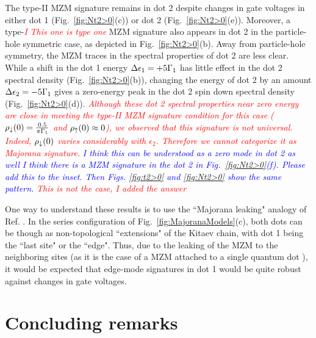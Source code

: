 \documentclass[showpacs,aps,prb,reprint,superscriptaddress]{revtex4-2}
\newcommand{\LUIS}[1]{\textcolor{blue}{\fbox{Luis} {\sl#1}}}
\newcommand{\Jesus}[1]{\textcolor{red}{\fbox{Jesus} {\sl#1}}}
\newcommand{\change}[1]{\textcolor{red}{\sl#1}}
\begin{document}
The type-II MZM signature remains in dot 2 despite changes in gate voltages in either dot 1  (Fig.\ \ref{fig:Nt2>0}(c)) or dot 2 (Fig.\ \ref{fig:Nt2>0}(e)). Moreover,  a type-\change{I} \Jesus{This one is type one} MZM signature also appears in dot 2  in the particle-hole symmetric case, as depicted in Fig.\ \ref{fig:Nt2>0}(b). Away from particle-hole symmetry, the MZM traces in the spectral properties of dot 2 are less clear. While a shift in the dot 1 energy $\Delta \epsilon_1=+5 \Gamma_1$ has little effect in the dot 2 spectral density (Fig.\ \ref{fig:Nt2>0}(b)), changing the energy of dot 2 by an amount  $\Delta \epsilon_2=-5 \Gamma_1$ gives a zero-energy peak in the dot 2 spin down spectral density (Fig.\ \ref{fig:Nt2>0}(d)). \change{Although these dot 2 spectral properties near zero energy are close in meeting the type-II MZM signature condition for this case ($\rho_\downarrow(0)=\frac{0.5}{\pi \Gamma_1}$ and $\rho_\uparrow(0) \approx 0$), we observed that this signature is not universal. Indeed, $\rho_\downarrow(0)$ varies considerably with  $\epsilon_2$. Therefore we cannot categorize it as Majorana signature.} 
\LUIS{I think this can be understood as a zero mode in dot 2 as well}    
  \LUIS{I think there is a MZM signature in the dot 2 in Fig.\ \ref{fig:Nt2>0}(f). Please add this to the inset. Then Figs. \ref{fig:t2>0} and \ref{fig:Nt2>0} show the same pattern. } \Jesus{This is not the case, I added the answer}

One way to understand these results is to use the ``Majorana leaking" analogy of Ref. \cite{vernek_subtle_2014}. In the series configuration of Fig.\ \ref{fig:MajoranaModels}(c), both dots can be though as non-topological ``extensions" of the Kitaev chain, with dot 1 being the ``last site" or the ``edge". Thus, due to the leaking of the MZM to the neighboring sites (as it is the case of a MZM attached to a single quantum dot \cite{vernek_subtle_2014,ruiz-tijerina_interaction_2015}), it would be expected that  edge-mode signatures in dot 1 would be quite robust against changes in gate voltages. 





\section{Concluding remarks}
\label{sec:Conclusions}
\end{document}
